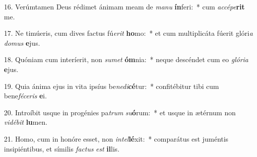 16. Verúmtamen Deus rédimet ánimam meam de \textit{ma}\textit{nu} \textbf{ín}feri:~*  cum \textit{ac}\textit{cé}\textit{pe}\textbf{rit} me.\

17. Ne timúeris, cum dives factus fú\textit{e}\textit{rit} \textbf{ho}mo:~*  et cum multiplicáta fúerit glóri\textit{a} \textit{do}\textit{mus} \textbf{e}jus.\

18. Quóniam cum interíerit, non \textit{su}\textit{met} \textbf{óm}nia:~*  neque descéndet cum eo \textit{gló}\textit{ri}\textit{a} \textbf{e}jus.\

19. Quia ánima ejus in vita ipsíus be\textit{ne}\textit{di}\textbf{cé}tur:~*  confitébitur tibi cum bene\textit{fé}\textit{ce}\textit{ris} \textbf{e}i.\

20. Introíbit usque in progénies pa\textit{trum} \textit{su}\textbf{ó}rum:~*  et usque in ætérnum non \textit{vi}\textit{dé}\textit{bit} \textbf{lu}men.\

21. Homo, cum in honóre esset, non \textit{in}\textit{tel}\textbf{lé}xit:~*  comparátus est juméntis insipiéntibus, et símilis \textit{fac}\textit{tus} \textit{est} \textbf{il}lis.\

